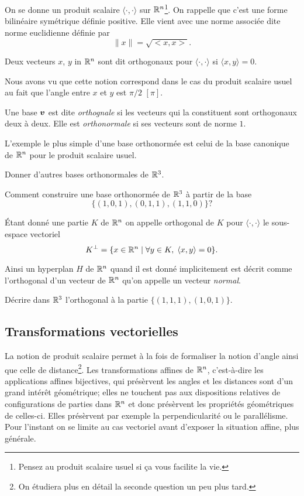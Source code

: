 \documentclass[11pt, a4paper]{article}
\begin{document}
On se donne un produit scalaire $\langle \cdot, \cdot \rangle$ sur
$\mathbb{R}^n$\footnote{Pensez au produit scalaire usuel si \c{c}a vous
  facilite la vie.}. On rappelle que c'est une forme bilinéaire
symétrique définie positive. Elle vient avec une norme associée dite
norme euclidienne définie par
\[
\|x\| = \sqrt{<x, x>}.
\]
\begin{defn}
  Deux vecteurs $x$, $y$ in $\mathbb{R}^n$ sont dit orthogonaux pour
  $\langle \cdot, \cdot \rangle$ si $\langle x, y \rangle = 0$.
\end{defn}
\noindent Nous avons vu que cette notion correspond dans le cas du
produit scalaire usuel au fait que l'angle entre $x$ et $y$ est
$\pi/2$ $[\pi]$.
\begin{defn}
  Une base $\boldsymbol{v}$ est dite \emph{orthognale} si les vecteurs qui la
  constituent sont orthogonaux deux à deux. Elle est
  \emph{orthonormale} si ses vecteurs sont de norme $1$.
\end{defn}
\noindent L'exemple le plus simple d'une base orthonormée est celui de
la base canonique de $\mathbb{R}^n$ pour le produit scalaire usuel.
\begin{question}
  Donner d'autres bases orthonormales de $\mathbb{R}^3$.
\end{question}
\begin{question}
  Comment construire une base orthonormée de $\mathbb{R}^3$ à partir de la
  base
  \[
  \{(1, 0, 1), (0, 1, 1), (1, 1, 0)\}?
  \]
\end{question}
\begin{defn}
  Étant donné une partie $K$ de $\mathbb{R}^n$ on appelle orthogonal de $K$
  pour $\langle \cdot, \cdot \rangle$ le sous-espace vectoriel
  \[
  K^\perp = \{ x \in \mathbb{R}^n \mid \forall y \in K, \; \langle x, y \rangle = 0 \}.
  \]
\end{defn}
\noindent Ainsi un hyperplan $H$ de $\mathbb{R}^n$ quand il est donné implicitement est
décrit comme l'orthogonal d'un vecteur de $\mathbb{R}^n$ qu'on appelle un
vecteur \emph{normal}.
\begin{question}
  Décrire dans $\mathbb{R}^3$ l'orthogonal à la partie $\{(1, 1, 1), (1, 0, 1)\}$.
\end{question}

\subsection{Transformations vectorielles}

La notion de produit scalaire permet à la fois de formaliser la notion
d'angle ainsi que celle de distance\footnote{On étudiera plus en
  détail la seconde question un peu plus tard.}. Les transformations
affines de $\mathbb{R}^n$, c'est-à-dire les applications affines bijectives,
qui présèrvent les angles et les distances sont d'un grand intérêt
géométrique; elles ne touchent pas aux dispositions relatives de
configurations de parties dans $\mathbb{R}^n$ et donc présèrvent les
propriétés géométriques de celles-ci. Elles présèrvent par exemple la
perpendicularité ou le parallélisme. Pour l'instant on se limite au
cas vectoriel avant d'exposer la situation affine, plus générale.
\end{document}
